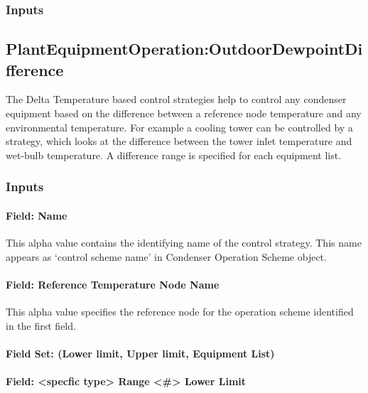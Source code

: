 \subsubsection{Inputs}\label{inputs-10-012}

\subsection{PlantEquipmentOperation:OutdoorDewpointDifference}\label{plantequipmentoperationoutdoordewpointdifference}

The Delta Temperature based control strategies help to control any condenser equipment based on the difference between a reference node temperature and any environmental temperature. For example a cooling tower can be controlled by a strategy, which looks at the difference between the tower inlet temperature and wet-bulb temperature. A difference range is specified for each equipment list.

\subsubsection{Inputs}\label{inputs-11-011}

\paragraph{Field: Name}\label{field-name-5-016}

This alpha value contains the identifying name of the control strategy. This name appears as `control scheme name' in Condenser Operation Scheme object.

\paragraph{Field: Reference Temperature Node Name}\label{field-reference-temperature-node-name}

This alpha value specifies the reference node for the operation scheme identified in the first field.

\paragraph{Field Set: (Lower limit, Upper limit, Equipment List)}\label{field-set-lower-limit-upper-limit-equipment-list}

\paragraph{Field: \textless{}specfic type\textgreater{} Range \textless{}\#\textgreater{} Lower Limit}\label{field-specfic-type-range-lower-limit-1}

